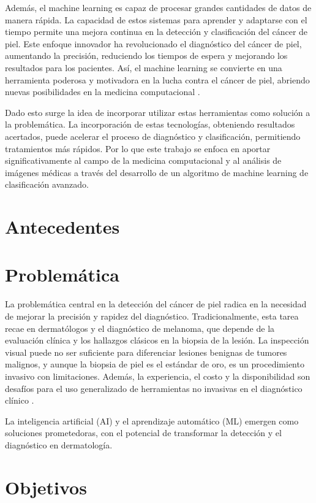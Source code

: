 Además, el machine learning es capaz de procesar grandes cantidades de datos de manera rápida. La capacidad de estos sistemas para aprender y adaptarse con el tiempo permite una mejora continua en la detección y clasificación del cáncer de piel. Este enfoque innovador ha revolucionado el diagnóstico del cáncer de piel, aumentando la precisión, reduciendo los tiempos de espera y mejorando los resultados para los pacientes. Así, el machine learning se convierte en una herramienta poderosa y motivadora en la lucha contra el cáncer de piel, abriendo nuevas posibilidades en la medicina computacional .

Dado esto surge la idea de incorporar utilizar estas herramientas como solución a la problemática. La incorporación de estas tecnologías, obteniendo resultados acertados, puede acelerar el proceso de diagnóstico y clasificación, permitiendo tratamientos más rápidos. Por lo que este trabajo se enfoca en aportar significativamente al campo de la medicina computacional y al análisis de imágenes médicas a través del desarrollo de un algoritmo de machine learning de clasificación avanzado.

\section*{Antecedentes}


\section*{Problemática}

La problemática central en la detección del cáncer de piel radica en la necesidad de mejorar la precisión y rapidez del diagnóstico. Tradicionalmente, esta tarea recae en dermatólogos y el diagnóstico de melanoma, que depende de la evaluación clínica y los hallazgos clásicos en la biopsia de la lesión. La inspección visual puede no ser suficiente para diferenciar lesiones benignas de tumores malignos, y aunque la biopsia de piel es el estándar de oro, es un procedimiento invasivo con limitaciones. Además, la experiencia, el costo y la disponibilidad son desafíos para el uso generalizado de herramientas no invasivas en el diagnóstico clínico .

La inteligencia artificial (AI) y el aprendizaje automático (ML) emergen como soluciones prometedoras, con el potencial de transformar la detección y el diagnóstico en dermatología.
\section*{Objetivos}

